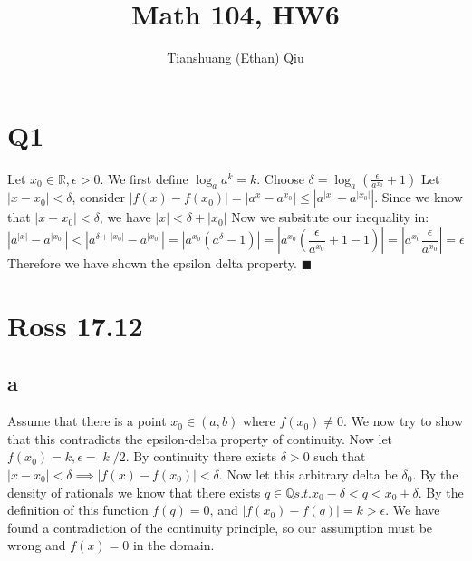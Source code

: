 \documentclass[12pt]{article}
\author{Tianshuang (Ethan) Qiu}
\newcommand{\R}{\mathbb{R}}
\newcommand{\Q}{\mathbb{Q}}
\begin{document}
\title{Math 104, HW6}
\maketitle
\newpage


\section{Q1}
Let $x_0 \in \R, \epsilon > 0$. We first define $\log_a a^k = k$. Choose $\delta = \log_a(\frac{\epsilon}{a^{x_0}}+1)$
\newline
Let $|x-x_0|<\delta$, consider $|f(x)-f(x_0)|=|a^x-a^{x_0}| \leq |a^{|x|}-a^{|x_0|}|$. Since we know that $|x-x_0|<\delta$, we have $|x|<\delta + |x_0|$
\newline
Now we subsitute our inequality in:
$$|a^{|x|}-a^{|x_0|}| < |a^{\delta + |x_0|}-a^{|x_0|}| = |a^{x_0}(a^\delta - 1)| = |a^{x_0}( \frac{\epsilon}{a^{x_0}}+1-1)| = |a^{x_0}\frac{\epsilon}{a^{x_0}}|=\epsilon$$
Therefore we have shown the epsilon delta property. $\blacksquare$
\newpage


\section{Ross 17.12}

\subsection{a}
Assume that there is a point $x_0 \in (a,b)$ where $f(x_0) \not= 0$. We now try to show that this contradicts the epsilon-delta property of continuity.
\newline
Now let $f(x_0) = k, \epsilon = |k|/2$. By continuity there exists $\delta > 0$ such that $|x-x_0|<\delta \implies |f(x)-f(x_0)|<\delta$. Now let this arbitrary delta be $\delta_0$. By the density of rationals we know that there exists $q \in \Q s.t. x_0-\delta < q < x_0+\delta$. By the definition of this function $f(q)=0$, and $|f(x_0)-f(q)|=k > \epsilon$. \lightning
\newline
We have found a contradiction of the continuity principle, so our assumption must be wrong and $f(x) = 0$ in the domain.
\end{document}
